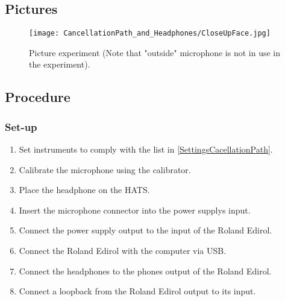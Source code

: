 \subsection{Pictures}

\begin{figure}[H]
	\centering
	\texttt{[image: CancellationPath\_and\_Headphones/CloseUpFace.jpg]}
	\caption{Picture experiment (Note that "outside" microphone is not in use in the experiment).}
	\label{CloseUpCancellationPath}
\end{figure}

\subsection{Procedure}
\subsubsection{Set-up}
\begin{enumerate}
	\item Set instruments to comply with the list in \ref{SettingsCacellationPath}.
	\item Calibrate the microphone using the calibrator. 
	\item Place the headphone on the HATS.
	\item Insert the microphone connector into the power supplys input.
	\item Connect the power supply output to the input of the Roland Edirol.
	\item Connect the Roland Edirol with the computer via USB.
	\item Connect the headphones to the phones output of the Roland Edirol.
	\item Connect a loopback from the Roland Edirol output to its input.
\end{enumerate}

